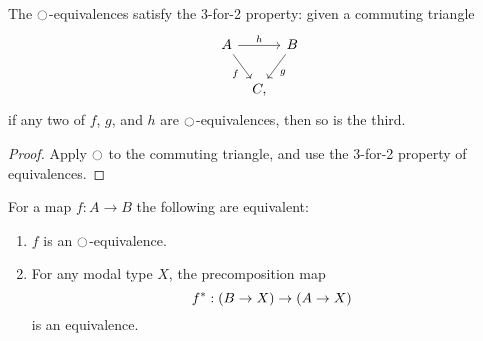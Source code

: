 \begin{lem}\label{lem:3for2_mequiv}
The ${\ocircle}$-equivalences satisfy the 3-for-2 property: given a commuting triangle
\begin{equation*}
\begin{tikzcd}[column sep=tiny]
A \arrow[rr,"h"] \arrow[dr,swap,"f"] & & B \arrow[dl,"g"] \\
& C,
\end{tikzcd}
\end{equation*}
if any two of $f$, $g$, and $h$ are ${\ocircle}$-equivalences, then so is the third.
\end{lem}

\begin{proof}
Apply ${\ocircle}$ to the commuting triangle, and use the 3-for-2 property of equivalences.
\end{proof}

\begin{lem}\label{lem:modal_equivalence}
For a map $f : A \to B$ the following are equivalent:
\begin{enumerate}
\item $f$ is an ${\ocircle}$-equivalence.
\item For any modal type $X$, the precomposition map
\begin{equation*}
{f}^\ast : (B \to X) \to (A \to X)
\end{equation*}
is an equivalence.
\end{enumerate}
\end{lem}

